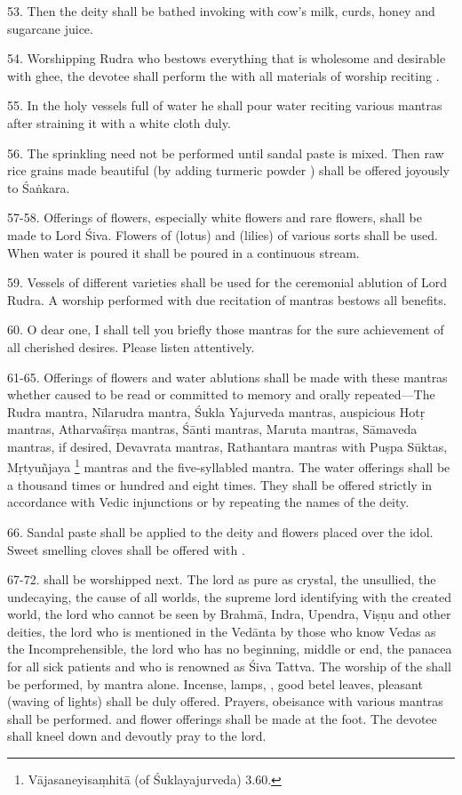 53. Then the deity shall be bathed invoking  with cow’s milk, curds,
honey and sugarcane juice.

54. Worshipping Rudra who bestows everything that is wholesome and desirable
with ghee, the devotee shall perform the  with all materials of
worship reciting .

55. In the holy vessels full of water he shall pour water reciting various
mantras after straining it with a white cloth duly.

56. The sprinkling need not be performed until sandal paste is mixed. Then raw
rice grains made beautiful (by adding turmeric powder \etc) shall be offered
joyously to Śaṅkara.

57-58. Offerings of flowers, especially white flowers and rare flowers, shall be
made to Lord Śiva. Flowers of  (lotus) and  (lilies) of various sorts
shall be used. When water is poured it shall be poured in a continuous stream.

59. Vessels of different varieties shall be used for the ceremonial ablution of
Lord Rudra. A worship performed with due recitation of mantras bestows all
benefits.

60. O dear one, I shall tell you briefly those mantras for the sure achievement
of all cherished desires. Please listen attentively.

61-65. Offerings of flowers and water ablutions shall be made with these mantras
whether caused to be read or committed to memory and orally repeated—The Rudra
mantra, Nīlarudra mantra, Śukla Yajurveda mantras, auspicious Hotṛ mantras,
Atharvaśīrṣa mantras, Śānti mantras, Maruta mantras, Sāmaveda mantras, if
desired, Devavrata mantras, Rathantara mantras with Puṣpa Sūktas, Mṛtyuñjaya
\footnote{Vājasaneyisaṃhitā (of Śuklayajurveda) 3.60.} mantras and
the five-syllabled mantra. The water offerings shall be a thousand times or
hundred and eight times. They shall be offered strictly in accordance with Vedic
injunctions or by repeating the names of the deity.

66. Sandal paste shall be applied to the deity and flowers placed over the idol.
Sweet smelling cloves \etc shall be offered with .

67-72.  shall be worshipped next. The lord as pure as crystal,
the unsullied, the undecaying, the cause of all worlds, the supreme lord
identifying with the created world, the lord who cannot be seen by Brahmā, Indra,
Upendra, Viṣṇu and other deities, the lord who is mentioned in the Vedānta by
those who know Vedas as the Incomprehensible, the lord who has no beginning,
middle or end, the panacea for all sick patients and who is renowned as Śiva
Tattva. The worship of the  shall be performed, by  mantra
alone. Incense, lamps, , good betel leaves, pleasant 
(waving of lights) shall be duly offered. Prayers, obeisance \etc with various
mantras shall be performed.  and flower offerings shall be made at
the foot. The devotee shall kneel down and devoutly pray to the lord.

